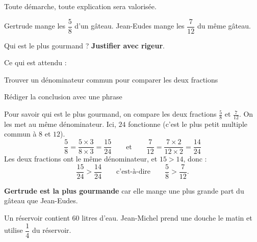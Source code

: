 \documentclass[answers]{exam}
\begin{document}
\begin{Indication}
Toute démarche, toute explication sera valorisée.
\end{Indication}

\begin{questions}
  \question[2] Gertrude mange les $\dfrac{5}{8}$ d'un gâteau. Jean-Eudes mange les $\dfrac{7}{12}$ du même gâteau.

  Qui est le plus gourmand ? \textbf{Justifier avec rigeur}.

  \begin{solution}
    \begin{Indication}
      Ce qui est attendu :
      \begin{compactitem}
        \item Trouver un dénominateur commun pour comparer les deux fractions
        \item Rédiger la conclusion avec une phrase
      \end{compactitem}
    \end{Indication}

    Pour savoir qui est le plus gourmand, on compare les deux fractions $\frac{5}{8}$ et $\frac{7}{12}$. On les met au même dénominateur. Ici, $24$ fonctionne (c'est le plus petit multiple commun à $8$ et $12$).
    \[
      \dfrac{5}{8} = \dfrac{5 \times 3}{8 \times 3} = \dfrac{15}{24}
      \qquad\text{et}\qquad
      \dfrac{7}{12} = \dfrac{7 \times 2}{12 \times 2} = \dfrac{14}{24}
    \]
    Les deux fractions ont le même dénominateur, et $15 > 14$, donc :
    \[
      \dfrac{15}{24} > \dfrac{14}{24}
      \qquad\text{c'est-à-dire}\qquad
      \dfrac{5}{8} > \dfrac{7}{12}.
    \]

    \textbf{Gertrude est la plus gourmande} car elle mange une plus grande part du gâteau que Jean-Eudes.
  \end{solution}

  \question[3] Un réservoir contient $60$ litres d'eau. Jean-Michel prend une douche le matin et utilise $\dfrac{1}{4}$ du réservoir.

\end{questions}
\end{document}
